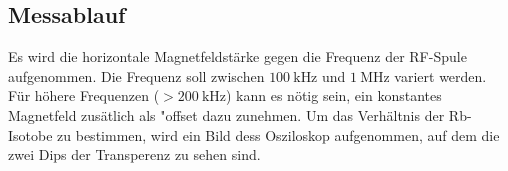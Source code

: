 \subsection{Messablauf}
Es wird die horizontale Magnetfeldstärke gegen die Frequenz der RF-Spule aufgenommen. Die Frequenz soll zwischen $\SI{100}{\kilo \hertz}$ und $\SI{1}{\mega \hertz}$ variert werden. Für höhere Frequenzen ($>\SI{200}{\kilo \hertz}$) kann es nötig sein, ein konstantes Magnetfeld zusätlich als "offset dazu zunehmen.
Um das Verhältnis der Rb-Isotobe zu bestimmen, wird ein Bild dess Osziloskop aufgenommen, auf dem die zwei Dips der Transperenz zu sehen sind.
